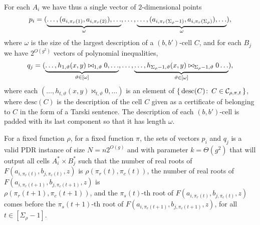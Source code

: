 For each $A_i$ we have thus a single vector of $2$-dimensional points
\begin{displaymath}
	p_i = (
		\underbrace{%
			\ldots,
			(a_{i,\pi_r(1)},a_{i,\pi_r(2)}),
			\ldots%
		}_{\omega},
		\ldots,
		\underbrace{%
			\ldots,
			(a_{i,\pi_r(\Sigma_\rho-1)},a_{i,\pi_r(\Sigma_\rho)}),
			\ldots%
		}_{\omega}
	),
\end{displaymath}
where $\omega$ is the size of the largest description of a $(b,b')$-cell $C$,
and for each $B_j$ we have $2^{O(g^2)}$ vectors of polynomial inequalities,
\begin{displaymath}
	q_j = (
		\underbrace{%
		\ldots,
		h_{1,\vartheta}(x,y) \bowtie_{1,\vartheta} 0,
		\ldots%
	}_{\vartheta \in [\omega]}
		,\ldots,
		\underbrace{%
		\ldots,
		h_{\Sigma_\rho-1,\vartheta}(x,y) \bowtie_{\Sigma_\rho-1,\vartheta} 0
		\ldots%
	}_{\vartheta \in [\omega]}
	),
\end{displaymath}
where each $(\ldots, h_{t,\vartheta}(x,y) \bowtie_{t,\vartheta} 0, \ldots)$
is an element of
$\{\, \text{desc}(C) \colon\, C \in \mathcal{C}_{\rho,\pi,t}\,\}$,
where $\text{desc}(C)$ is the description of the cell $C$ given as a
certificate of belonging to $C$ in the form of a Tarski sentence.
The description of each $(b,b')$-cell is padded with
its last component so that it has length $\omega$.

For a fixed function $\rho$,
for a fixed function $\pi$,
the sets of vectors $p_i$ and $q_j$ is a valid PDR instance
of size $N = n 2^{O(g)}$ and with parameter $k = \Theta(g^2)$
that will
output all cells $A^*_i \times B^*_j$ such that
the number of real roots of $F(a_{i,\pi_r(t)},b_{j,\pi_c(t)},z)$
is $\rho(\pi_r(t),\pi_c(t))$,
the number of real roots of $F(a_{i,\pi_r(t+1)},b_{j,\pi_c(t+1)},z)$
is \\ $\rho(\pi_r(t+1),\pi_c(t+1))$,
and the $\pi_s(t)$-th root of $F(a_{i,\pi_r(t)},b_{j,\pi_c(t)},z)$
comes before the $\pi_s(t+1)$-th root of
$F(a_{i,\pi_r(t+1)},b_{j,\pi_c(t+1)},z)$,
for all $t \in [\Sigma_\rho-1]$.

